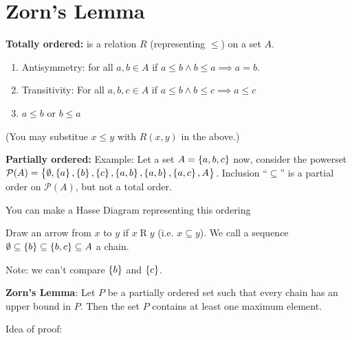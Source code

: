 \documentclass{article}
\begin{document}
\section{Zorn's Lemma}
\begin{aside}[Recall]

  \textbf{Totally ordered:} \There is a relation \(R\) (representing \(\leq\)) on a set \(A\).
  \begin{enumerate}
  \item Antisymmetry: for all \(a, b \in A\) if \(a \leq b \land b \leq a \implies a = b\).
  \item Transitivity: For all \(a,b,c \in A\) if \(a \leq b \land b \leq c \implies a \leq c\)
  \item \(a \leq b\) or \(b \leq a\)
  \end{enumerate}
  (You may substitue \(x \leq y\) with \(R( x, y)\) in the above.)

  \textbf{Partially ordered:}
  Example: Let a set \(A = \set{a, b, c}\) now, consider the powerset \(\mathcal{P}(A) = \set{\emptyset, \set{a}, \set{b}, \set{c}, \set{a, b}, \set{a, b}, \set{a, c}, A}\).
  Inclusion ``\(\subseteq\)'' is a partial order on \(\mathcal{P}(A)\), but not a total order.

  You can make a Hasse Diagram representing this ordering
  \begin{center}
  \end{center}
  Draw an arrow from \(x\) to \(y\) if \(x \mathop{\mathrm{R}} y\) (i.e. \(x \subseteq y\)).
  We call a sequence \(\emptyset \subseteq \set{b} \subseteq \set{b, c} \subseteq A\) a chain.

  Note: we can't compare \(\set{b}\) and \(\set{c}\).
\end{aside}

\textbf{Zorn's Lemma}: Let \(P\) be a partially ordered set such that every chain has an upper bound in \(P\).
Then the set \(P\) contains at least one maximum element.

Idea of proof:
\end{document}
